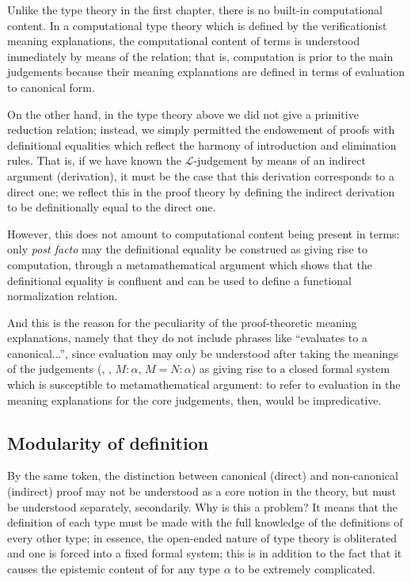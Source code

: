 \documentclass[main.tex]{subfiles}
\begin{document}
Unlike the type theory in the first chapter, there is no built-in computational
content. In a computational type theory which is defined by the verificationist
meaning explanations, the computational content of terms is understood
immediately by means of the  relation; that is, computation is
prior to the main judgements because their meaning explanations are defined in
terms of evaluation to canonical form.

On the other hand, in the type theory above we did not give a primitive
reduction relation; instead, we simply permitted the endowement of proofs
with definitional equalities which reflect the harmony of introduction and
elimination rules. That is, if we have known the $\mathcal{L}$-judgement
 by means of an indirect argument (derivation), it must be the case
that this derivation corresponds to a direct one; we reflect this in the
proof theory by defining the indirect derivation to be definitionally equal to
the direct one.

However, this does not amount to computational content being present in terms:
only \emph{post facto} may the definitional equality be construed as giving
rise to computation, through a metamathematical argument which shows that the
definitional equality is confluent and can be used to define a functional
normalization relation.

And this is the reason for the peculiarity of the proof-theoretic meaning
explanations, namely that they do not include phrases like ``evaluates to a
canonical...'', since evaluation may only be understood after taking the
meanings of the judgements (\type\alpha, \type{\alpha=\beta}, $M:\alpha$,
$M=N:\alpha$) as giving rise to a closed formal system which is susceptible to
metamathematical argument: to refer to evaluation in the meaning explanations
for the core judgements, then, would be impredicative.

\subsection{Modularity of definition}

By the same token, the distinction between canonical (direct) and non-canonical
(indirect) proof may not be understood as a core notion in the theory, but must
be understood separately, secondarily. Why is this a problem? It means that the
definition of each type must be made with the full knowledge of the definitions
of every other type; in essence, the open-ended nature of type theory is
obliterated and one is forced into a fixed formal system; this is in addition
to the fact that it causes the epistemic content of \type\alpha for any type
$\alpha$ to be extremely complicated.
\end{document}
